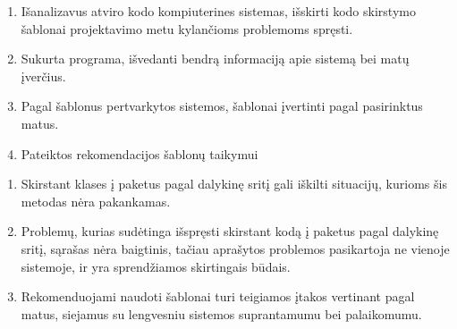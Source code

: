 \documentclass[
]{VUMIFPSbakalaurinis}
\begin{document}
\tableofcontents






%


\begin{enumerate}
    \item Išanalizavus atviro kodo kompiuterines sistemas, išskirti kodo skirstymo šablonai projektavimo metu kylančioms problemoms spręsti.
    \item Sukurta programa, išvedanti bendrą informaciją apie sistemą bei matų įverčius.
    \item Pagal šablonus pertvarkytos sistemos, šablonai įvertinti pagal pasirinktus matus.
    \item Pateiktos rekomendacijos šablonų taikymui
\end{enumerate}

\begin{enumerate}[labelindent=0pt]
    \item Skirstant klases į paketus pagal dalykinę sritį gali iškilti situacijų, kurioms šis metodas nėra pakankamas.
    \item Problemų, kurias sudėtinga išspręsti skirstant kodą į paketus pagal dalykinę sritį, sąrašas nėra baigtinis, tačiau
    aprašytos problemos pasikartoja ne vienoje sistemoje, ir yra sprendžiamos skirtingais būdais.
    \item Rekomenduojami naudoti šablonai turi teigiamos įtakos vertinant pagal matus, siejamus su lengvesniu sistemos suprantamumu bei palaikomumu.
\end{enumerate}

\printbibliography[heading=bibintoc]  %

%
\end{document}
